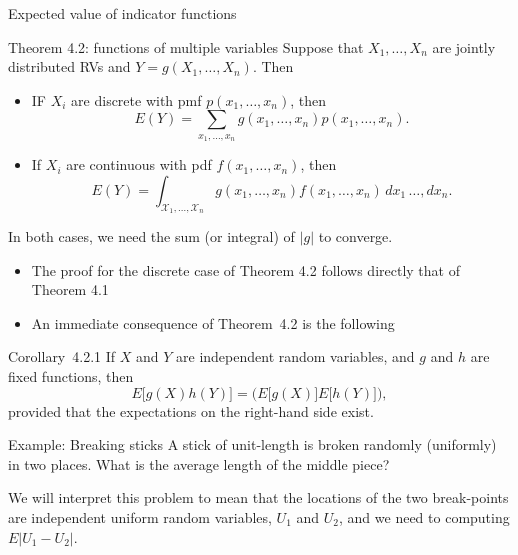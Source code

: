 \begin{frame}[allowframebreaks]{Expected value of indicator functions}
  \begin{block}{Theorem 4.2: functions of multiple variables}
    Suppose that $X_1, \ldots, X_n$ are jointly distributed RVs and $Y = g(X_1, \ldots, X_n)$. Then
    \begin{itemize}
      \item IF $X_i$ are discrete with pmf $p(x_1, \ldots, x_n)$, then
      $$
      E(Y) = \sum_{x_1, \ldots, x_n} g(x_1, \ldots, x_n)p(x_1, \ldots, x_n).
      $$
      \item If $X_i$ are continuous with pdf $f(x_1, \ldots, x_n)$, then
      $$
      E(Y) = \int_{\mathcal{X}_1, \ldots, \mathcal{X}_n}g(x_1, \ldots, x_n)f(x_1, \ldots, x_n)\, dx_1\,\ldots,dx_n.
      $$
    \end{itemize}
    In both cases, we need the sum (or integral) of $|g|$ to converge.
  \end{block}

\framebreak

\begin{itemize}
  \item The proof for the discrete case of Theorem 4.2 follows directly that of Theorem 4.1
  \item An immediate consequence of Theorem~4.2 is the following
\end{itemize}

\begin{block}{Corollary~4.2.1}
  If $X$ and $Y$ are independent random variables, and $g$ and $h$ are fixed functions, then
  $$
  E\big[g(X)h(Y)\big] = \Big(E\big[g(X)\big]E\big[h(Y)\big]\Big),
  $$
  provided that the expectations on the right-hand side exist.
\end{block}

\begin{exampleblock}{Example: Breaking sticks}
  A stick of unit-length is broken randomly (uniformly) in two places. What is the average length of the middle piece?
  
  We will interpret this problem to mean that the locations of the two break-points are independent uniform random variables, $U_1$ and $U_2$, and we need to computing $E|U_1 - U_2|$.
  

\end{exampleblock}
\end{frame}
